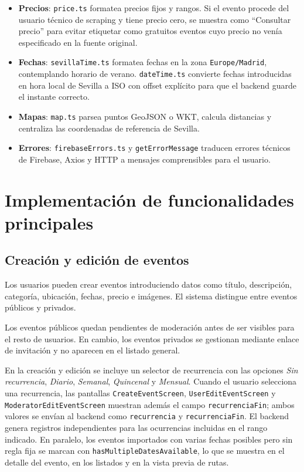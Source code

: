 \begin{itemize}
    \item \textbf{Precios}: \texttt{price.ts} formatea precios fijos y rangos. Si el evento procede del usuario técnico de scraping y tiene precio cero, se muestra como ``Consultar precio'' para evitar etiquetar como gratuitos eventos cuyo precio no venía especificado en la fuente original.
    \item \textbf{Fechas}: \texttt{sevillaTime.ts} formatea fechas en la zona \texttt{Europe/Madrid}, contemplando horario de verano. \texttt{dateTime.ts} convierte fechas introducidas en hora local de Sevilla a ISO con offset explícito para que el backend guarde el instante correcto.
    \item \textbf{Mapas}: \texttt{map.ts} parsea puntos GeoJSON o WKT, calcula distancias y centraliza las coordenadas de referencia de Sevilla.
    \item \textbf{Errores}: \texttt{firebaseErrors.ts} y \texttt{getErrorMessage} traducen errores técnicos de Firebase, Axios y HTTP a mensajes comprensibles para el usuario.
\end{itemize}

\section{Implementación de funcionalidades principales}

\subsection{Creación y edición de eventos}

Los usuarios pueden crear eventos introduciendo datos como título, descripción, categoría, ubicación, fechas, precio e imágenes. El sistema distingue entre eventos públicos y privados.

Los eventos públicos quedan pendientes de moderación antes de ser visibles para el resto de usuarios. En cambio, los eventos privados se gestionan mediante enlace de invitación y no aparecen en el listado general.

En la creación y edición se incluye un selector de recurrencia con las opciones \textit{Sin recurrencia}, \textit{Diario}, \textit{Semanal}, \textit{Quincenal} y \textit{Mensual}. Cuando el usuario selecciona una recurrencia, las pantallas \texttt{CreateEventScreen}, \texttt{UserEditEventScreen} y \texttt{ModeratorEditEventScreen} muestran además el campo \texttt{recurrenciaFin}; ambos valores se envían al backend como \texttt{recurrencia} y \texttt{recurrenciaFin}. El backend genera registros independientes para las ocurrencias incluidas en el rango indicado. En paralelo, los eventos importados con varias fechas posibles pero sin regla fija se marcan con \texttt{hasMultipleDatesAvailable}, lo que se muestra en el detalle del evento, en los listados y en la vista previa de rutas.

